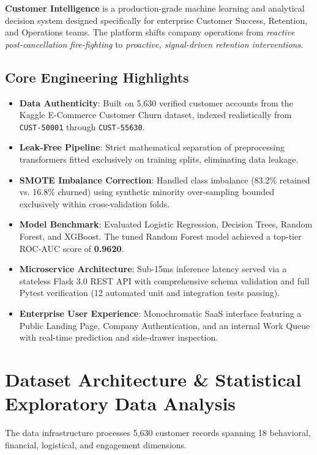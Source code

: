 \documentclass[11pt,a4paper]{article}
\begin{document}
\textbf{Customer Intelligence} is a production-grade machine learning and analytical decision system designed specifically for enterprise Customer Success, Retention, and Operations teams. The platform shifts company operations from \textit{reactive post-cancellation fire-fighting} to \textit{proactive, signal-driven retention interventions}.

\subsection{Core Engineering Highlights}
\begin{itemize}[noitemsep]
    \item \textbf{Data Authenticity}: Built on 5,630 verified customer accounts from the Kaggle E-Commerce Customer Churn dataset, indexed realistically from \texttt{CUST-50001} through \texttt{CUST-55630}.
    \item \textbf{Leak-Free Pipeline}: Strict mathematical separation of preprocessing transformers fitted exclusively on training splits, eliminating data leakage.
    \item \textbf{SMOTE Imbalance Correction}: Handled class imbalance (83.2\% retained vs. 16.8\% churned) using synthetic minority over-sampling bounded exclusively within cross-validation folds.
    \item \textbf{Model Benchmark}: Evaluated Logistic Regression, Decision Trees, Random Forest, and XGBoost. The tuned Random Forest model achieved a top-tier ROC-AUC score of \textbf{0.9620}.
    \item \textbf{Microservice Architecture}: Sub-15ms inference latency served via a stateless Flask 3.0 REST API with comprehensive schema validation and full Pytest verification (12 automated unit and integration tests passing).
    \item \textbf{Enterprise User Experience}: Monochromatic SaaS interface featuring a Public Landing Page, Company Authentication, and an internal Work Queue with real-time prediction and side-drawer inspection.
\end{itemize}

\section{Dataset Architecture \& Statistical Exploratory Data Analysis}
The data infrastructure processes 5,630 customer records spanning 18 behavioral, financial, logistical, and engagement dimensions.
\end{document}
